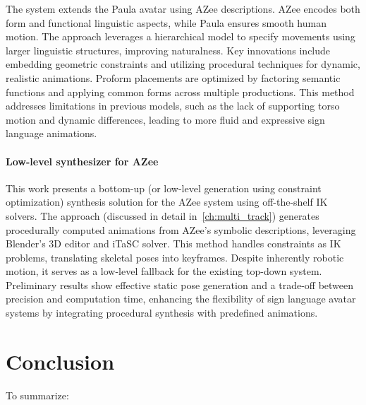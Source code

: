 \documentclass[../../main.tex]{subfiles}
\begin{document}
The system extends the Paula avatar using AZee descriptions. AZee encodes both form and functional linguistic aspects, while Paula ensures smooth human motion. The approach leverages a hierarchical model to specify movements using larger linguistic structures, improving naturalness. Key innovations include embedding geometric constraints and utilizing procedural techniques for dynamic, realistic animations. Proform placements are optimized by factoring semantic functions and applying common forms across multiple productions. This method addresses limitations in previous models, such as the lack of supporting torso motion and dynamic differences, leading to more fluid and expressive sign language animations.

\paragraph{Low-level synthesizer for AZee}
\label{ch:background_work:sign_language_synthesis:3d_techniques:sign_language_synthesis_systems:azee_based:low_level_synthesizer_for_azee}

This work presents a bottom-up (or low-level generation using constraint optimization) synthesis solution for the AZee system using off-the-shelf IK solvers. The approach (discussed in detail in~\ref{ch:multi_track}) generates procedurally computed animations from AZee's symbolic descriptions, leveraging Blender's 3D editor and iTaSC solver. This method handles constraints as IK problems, translating skeletal poses into keyframes. Despite inherently robotic motion, it serves as a low-level fallback for the existing top-down system. Preliminary results show effective static pose generation and a trade-off between precision and computation time, enhancing the flexibility of sign language avatar systems by integrating procedural synthesis with predefined animations.

\section{Conclusion}
\label{ch:background_work:conclusion}

To summarize:
\end{document}
